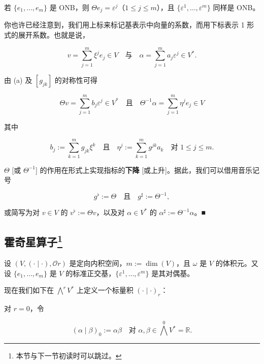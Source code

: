 \begin{remark}
\begin{items}
若 $ \{e_{1},\ldots,e_{m}\} $ 是 ONB，则 $ \Theta e_{j} = \varepsilon^{j} $（$ 1 \le j \le m $），且 $ \{\varepsilon^{1},\ldots,\varepsilon^{m}\} $ 同样是 ONB。

\item

你也许已经注意到，我们用上标来标记基表示中向量的系数，而用下标表示 1 形式的展开系数。也就是说，

\[
v = \sum_{j=1}^{m}\xi^{j}e_{j} \in V \quad \text{与} \quad \alpha = \sum_{j=1}^{m} a_{j}\varepsilon^{j} \in V^{*} .
\]

由 (a) 及 $ [g_{jk}] $ 的对称性可得

\[
\Theta v = \sum_{j=1}^{m} b_j\varepsilon^{j} \in V^{*} \quad \text{且} \quad \Theta^{-1}\alpha = \sum_{j=1}^{m} \eta^{j}e_j \in V
\]

其中

\[
b_j := \sum_{k=1}^{m} g_{jk}\xi^{k} \quad \text{且} \quad \eta^{j} := \sum_{k=1}^{m} g^{jk}a_k \quad \text{对 } 1 \le j \le m.
\]

$ \Theta $ [或 $ \Theta^{-1} $] 的作用在形式上实现指标的\textbf{下降} [或上升]。据此，我们可以借用音乐记号

\[
g^{\flat} := \Theta \quad \text{且} \quad g^{\sharp} := \Theta^{-1},
\]

或简写为对 $ v \in V $ 的 $ v^{\flat} := \Theta v $，以及对 $ \alpha \in V^{*} $ 的 $ \alpha^{\sharp} := \Theta^{-1}\alpha $。\nobreak\hspace{0.35em}■

\end{items}

\end{remark}

\subsection*{霍奇星算子\footnote{本节与下一节初读时可以跳过。}}

设 $ (V, (\cdot \mid \cdot), \mathcal{O}r) $ 是定向内积空间，$ m := \dim(V) $，且 $ \omega $ 是 $ V $ 的体积元。又设 $ \{e_1,\ldots,e_m\} $ 是 $ V $ 的标准正交基，$ \{\varepsilon^1,\ldots,\varepsilon^m\} $ 是其对偶基。

现在我们如下在 $ \bigwedge^{r}V^{*} $ 上定义一个标量积 $ (\cdot \mid \cdot)_r $：

对 $ r = 0 $，令

\begin{equation}
(\alpha \mid \beta)_0 := \alpha\beta \quad \text{对 } \alpha, \beta \in \bigwedge^{0}V^{*} = \mathbb{R}.\tag{2.14}
\end{equation}

